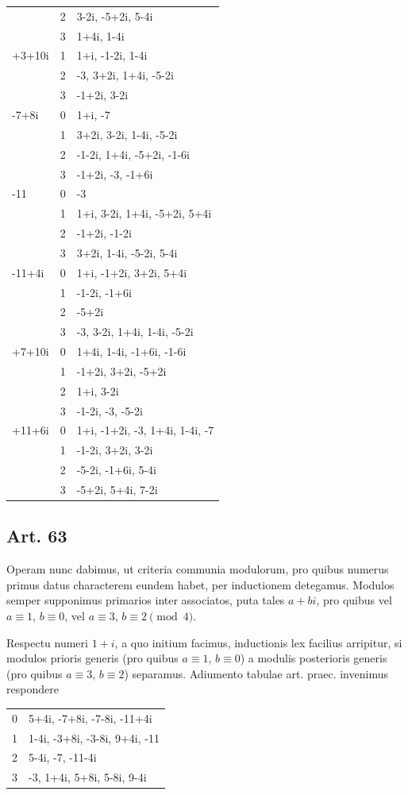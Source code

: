 \documentclass[12pt]{article}
\newcommand{\art}[1]{\subsection*{Art. #1}}
\begin{document}
\begin{center}
\begin{longtable}{L C L}
 & 2 & 3-2i, -5+2i, 5-4i\\
 & 3 & 1+4i, 1-4i\\
+3+10i & 1 & 1+i, -1-2i, 1-4i\\
 & 2 & -3, 3+2i, 1+4i, -5-2i\\
 & 3 & -1+2i, 3-2i\\
-7+8i & 0 & 1+i, -7\\
 & 1 & 3+2i, 3-2i, 1-4i, -5-2i\\
 & 2 & -1-2i, 1+4i, -5+2i, -1-6i\\
 & 3 & -1+2i, -3, -1+6i\\
-11 & 0 & -3\\
 & 1 & 1+i, 3-2i, 1+4i, -5+2i, 5+4i\\
 & 2 & -1+2i, -1-2i\\
 & 3 & 3+2i, 1-4i, -5-2i, 5-4i\\
-11+4i & 0 & 1+i, -1+2i, 3+2i, 5+4i\\
 & 1 & -1-2i, -1+6i\\
 & 2 & -5+2i\\
 & 3 & -3, 3-2i, 1+4i, 1-4i, -5-2i\\
+7+10i & 0 & 1+4i, 1-4i, -1+6i, -1-6i\\
 & 1 & -1+2i, 3+2i, -5+2i\\
 & 2 & 1+i, 3-2i\\
 & 3 & -1-2i, -3, -5-2i\\
+11+6i & 0 & 1+i, -1+2i, -3, 1+4i, 1-4i, -7\\
 & 1 & -1-2i, 3+2i, 3-2i\\
 & 2 & -5-2i, -1+6i, 5-4i\\
 & 3 & -5+2i, 5+4i, 7-2i\\
\bottomrule
\end{longtable}
\end{center}

\art{63}
Operam nunc dabimus, ut criteria communia modulorum, pro quibus numerus primus datus characterem eundem habet, per inductionem detegamus. Modulos semper supponimus primarios inter associatos, puta tales $a+bi$, pro quibus vel $a\equiv1$, $b\equiv0$, vel $a\equiv3$, $b\equiv2\pmod 4$.

Respectu numeri $1+i$, a quo initium facimus, inductionis lex facilius arripitur, si modulos prioris generis (pro quibus $a\equiv1$, $b\equiv0$) a modulis posterioris generis (pro quibus $a\equiv3$, $b\equiv2$) separamus. Adiumento tabulae art. praec. invenimus respondere

\begin{center}\small
\begin{tabular}{C L}
\toprule
{} & \\
 & 5+4i, -7+8i, -7-8i, -11+4i\\
1 & 1-4i, -3+8i, -3-8i, 9+4i, -11\\
2 & 5-4i, -7, -11-4i\\
3 & -3, 1+4i, 5+8i, 5-8i, 9-4i\\
\bottomrule
\end{tabular}
\end{center}
\end{document}
